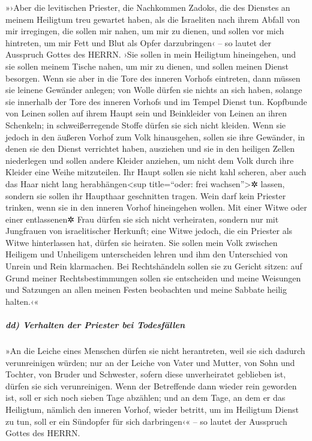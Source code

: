 »›Aber die levitischen Priester, die Nachkommen Zadoks,
die des Dienstes an meinem Heiligtum treu gewartet haben, als die
Israeliten nach ihrem Abfall von mir irregingen, die sollen mir nahen,
um mir zu dienen, und sollen vor mich hintreten, um mir Fett und Blut
als Opfer darzubringen‹ -- so lautet der Ausspruch Gottes des HERRN.
›Sie sollen in mein Heiligtum hineingehen, und sie sollen
meinem Tische nahen, um mir zu dienen, und sollen meinen Dienst
besorgen. Wenn sie aber in die Tore des inneren Vorhofs
eintreten, dann müssen sie leinene Gewänder anlegen; von Wolle dürfen
sie nichts an sich haben, solange sie innerhalb der Tore des inneren
Vorhofs und im Tempel Dienst tun. Kopfbunde von Leinen
sollen auf ihrem Haupt sein und Beinkleider von Leinen an ihren
Schenkeln; in schweißerregende Stoffe dürfen sie sich nicht kleiden.
Wenn sie jedoch in den äußeren Vorhof zum Volk
hinausgehen, sollen sie ihre Gewänder, in denen sie den Dienst
verrichtet haben, ausziehen und sie in den heiligen Zellen niederlegen
und sollen andere Kleider anziehen, um nicht dem Volk durch ihre Kleider
eine Weihe mitzuteilen. Ihr Haupt sollen sie nicht kahl
scheren, aber auch das Haar nicht lang herabhängen\textless sup
title=``oder: frei wachsen''\textgreater✲ lassen, sondern sie sollen ihr
Haupthaar geschnitten tragen. Wein darf kein Priester
trinken, wenn sie in den inneren Vorhof hineingehen wollen.
Mit einer Witwe oder einer entlassenen✲ Frau dürfen sie
sich nicht verheiraten, sondern nur mit Jungfrauen von israelitischer
Herkunft; eine Witwe jedoch, die ein Priester als Witwe hinterlassen
hat, dürfen sie heiraten. Sie sollen mein Volk zwischen
Heiligem und Unheiligem unterscheiden lehren und ihm den Unterschied von
Unrein und Rein klarmachen. Bei Rechtshändeln sollen sie
zu Gericht sitzen: auf Grund meiner Rechtsbestimmungen sollen sie
entscheiden und meine Weisungen und Satzungen an allen meinen Festen
beobachten und meine Sabbate heilig halten.‹«

\hypertarget{dd-verhalten-der-priester-bei-todesfuxe4llen}{%
\subparagraph{dd) Verhalten der Priester bei
Todesfällen}\label{dd-verhalten-der-priester-bei-todesfuxe4llen}}

»An die Leiche eines Menschen dürfen sie nicht
herantreten, weil sie sich dadurch verunreinigen würden; nur an der
Leiche von Vater und Mutter, von Sohn und Tochter, von Bruder und
Schwester, sofern diese unverheiratet geblieben ist, dürfen sie sich
verunreinigen. Wenn der Betreffende dann wieder rein
geworden ist, soll er sich noch sieben Tage abzählen; und
an dem Tage, an dem er das Heiligtum, nämlich den inneren Vorhof, wieder
betritt, um im Heiligtum Dienst zu tun, soll er ein Sündopfer für sich
darbringen‹« -- so lautet der Ausspruch Gottes des HERRN.

